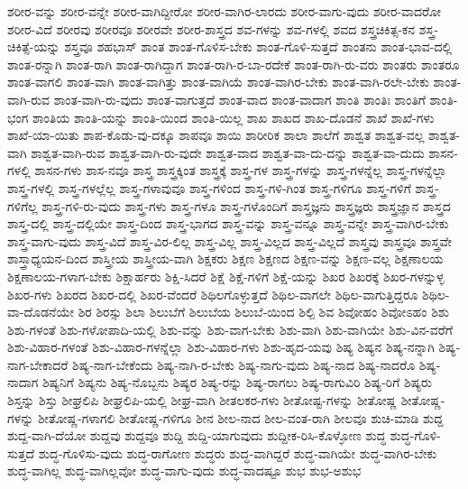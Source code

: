 {ಶರೀರ-ವನ್ನು
ಶರೀರ-ವನ್ನೇ
ಶರೀರ-ವಾಗಿದ್ದೀರೋ
ಶರೀರ-ವಾಗಿರ-ಲಾರದು
ಶರೀರ-ವಾಗು-ವುದು
ಶರೀರ-ವಾದರೋ
ಶರೀರ-ವಿದೆ
ಶರೀರವು
ಶರೀರವೂ
ಶರೀರವೇ
ಶರೀರ-ಶಾಸ್ತ್ರದ
ಶವ-ಗಳನ್ನು
ಶವ-ಗಳಲ್ಲಿ
ಶವದ
ಶಸ್ತ್ರಚಿಕಿತ್ಸ-ಕನ
ಶಸ್ತ್ರ-ಚಿಕಿತ್ಸೆ-ಯನ್ನು
ಶಸ್ತ್ರವೂ
ಶಹಭಾಸ್
ಶಾಂತ
ಶಾಂತ-ಗೊಳಿಸ-ಬೇಕು
ಶಾಂತ-ಗೊಳಿ-ಸುತ್ತದೆ
ಶಾಂತನು
ಶಾಂತ-ಭಾವ-ದಲ್ಲಿ
ಶಾಂತ-ರನ್ನಾಗಿ
ಶಾಂತ-ರಾಗಿ
ಶಾಂತ-ರಾಗಿದ್ದಾಗ
ಶಾಂತ-ರಾಗಿ-ರ-ಬಾ-ರದೇಕೆ
ಶಾಂತ-ರಾಗಿ-ರು-ವರು
ಶಾಂತರು
ಶಾಂತರೂ
ಶಾಂತ-ವಾಗಲಿ
ಶಾಂತ-ವಾಗಿ
ಶಾಂತ-ವಾಗಿತ್ತು
ಶಾಂತ-ವಾಗಿಯೆ
ಶಾಂತ-ವಾಗಿರ-ಬೇಕು
ಶಾಂತ-ವಾಗಿ-ರಲೇ-ಬೇಕು
ಶಾಂತ-ವಾಗಿ-ರುವ
ಶಾಂತ-ವಾಗಿ-ರು-ವುದು
ಶಾಂತ-ವಾಗುತ್ತದೆ
ಶಾಂತ-ವಾದ
ಶಾಂತ-ವಾದಾಗ
ಶಾಂತಿ
ಶಾಂತಿಃ
ಶಾಂತಿಗೆ
ಶಾಂತಿ-ಭಂಗ
ಶಾಂತಿಯ
ಶಾಂತಿ-ಯನ್ನು
ಶಾಂತಿ-ಯಿಂದ
ಶಾಂತಿ-ಯಿಲ್ಲ
ಶಾಖ
ಶಾಖದ
ಶಾಖ-ದೊಡನೆ
ಶಾಖೆ
ಶಾಖೆ-ಗಳು
ಶಾಖೆ-ಯಾ-ಯಿತು
ಶಾಪ-ಕೊಡು-ವು-ದಕ್ಕೂ
ಶಾಪವೂ
ಶಾಯಿ
ಶಾರೀರಿಕ
ಶಾಲಾ
ಶಾಲೆಗೆ
ಶಾಶ್ವತ
ಶಾಶ್ವತ-ವಲ್ಲ
ಶಾಶ್ವತ-ವಾಗಿ
ಶಾಶ್ವತ-ವಾಗಿ-ರುವ
ಶಾಶ್ವತ-ವಾಗಿ-ರು-ವುದೇ
ಶಾಶ್ವತ-ವಾದ
ಶಾಶ್ವತ-ವಾ-ದು-ದನ್ನು
ಶಾಶ್ವತ-ವಾ-ದುದು
ಶಾಸನ-ಗಳಲ್ಲಿ
ಶಾಸನ-ಗಳು
ಶಾಸ-ನವೂ
ಶಾಸ್ತ್ರ
ಶಾಸ್ತ್ರಕ್ಕಿಂತ
ಶಾಸ್ತ್ರಕ್ಕೆ
ಶಾಸ್ತ್ರ-ಗಳ
ಶಾಸ್ತ್ರ-ಗಳನ್ನು
ಶಾಸ್ತ್ರ-ಗಳನ್ನೆಲ್ಲ
ಶಾಸ್ತ್ರ-ಗಳನ್ನೆಲ್ಲಾ
ಶಾಸ್ತ್ರ-ಗಳಲ್ಲಿ
ಶಾಸ್ತ್ರ-ಗಳಲ್ಲೆಲ್ಲ
ಶಾಸ್ತ್ರ-ಗಳಾವುವೂ
ಶಾಸ್ತ್ರ-ಗಳಿಂದ
ಶಾಸ್ತ್ರ-ಗಳಿ-ಗಿಂತ
ಶಾಸ್ತ್ರ-ಗಳಿಗೂ
ಶಾಸ್ತ್ರ-ಗಳಿಗೆ
ಶಾಸ್ತ್ರ-ಗಳಿಗೆಲ್ಲ
ಶಾಸ್ತ್ರ-ಗಳಿ-ರು-ವುದು
ಶಾಸ್ತ್ರ-ಗಳು
ಶಾಸ್ತ್ರ-ಗಳೂ
ಶಾಸ್ತ್ರ-ಗಳೊಂದಿಗೆ
ಶಾಸ್ತ್ರಜ್ಞನು
ಶಾಸ್ತ್ರಜ್ಞರು
ಶಾಸ್ತ್ರಜ್ಞಾನ
ಶಾಸ್ತ್ರದ
ಶಾಸ್ತ್ರ-ದಲ್ಲಿ
ಶಾಸ್ತ್ರ-ದಲ್ಲಿಯೇ
ಶಾಸ್ತ್ರ-ದಿಂದ
ಶಾಸ್ತ್ರ-ಭಾಗದ
ಶಾಸ್ತ್ರ-ವನ್ನು
ಶಾಸ್ತ್ರ-ವನ್ನೂ
ಶಾಸ್ತ್ರ-ವನ್ನೇ
ಶಾಸ್ತ್ರ-ವಾಗಿರ-ಬೇಕು
ಶಾಸ್ತ್ರ-ವಾಗು-ವುದು
ಶಾಸ್ತ್ರ-ವಿದೆ
ಶಾಸ್ತ್ರ-ವಿರ-ಲಿಲ್ಲ
ಶಾಸ್ತ್ರ-ವಿಲ್ಲ
ಶಾಸ್ತ್ರ-ವಿಲ್ಲದ
ಶಾಸ್ತ್ರ-ವಿಲ್ಲದೆ
ಶಾಸ್ತ್ರವು
ಶಾಸ್ತ್ರವೂ
ಶಾಸ್ತ್ರವೇ
ಶಾಸ್ತ್ರಾಧ್ಯಯನ-ದಿಂದ
ಶಾಸ್ತ್ರೀಯ
ಶಾಸ್ತ್ರೀಯ-ವಾಗಿ
ಶಿಕ್ಷಕರು
ಶಿಕ್ಷಣ
ಶಿಕ್ಷಣದ
ಶಿಕ್ಷಣ-ವನ್ನು
ಶಿಕ್ಷಣ-ವಲ್ಲ
ಶಿಕ್ಷಣಾಲಯ
ಶಿಕ್ಷಣಾಲಯ-ಗಳಾಗ-ಬೇಕು
ಶಿಕ್ಷಾರ್ಹರು
ಶಿಕ್ಷಿ-ಸಿದರೆ
ಶಿಕ್ಷೆ
ಶಿಕ್ಷೆ-ಗಳಿಗೆ
ಶಿಕ್ಷೆ-ಯನ್ನು
ಶಿಖರ
ಶಿಖರಕ್ಕೆ
ಶಿಖರ-ಗಳನ್ನುಳ್ಳ
ಶಿಖರ-ಗಳು
ಶಿಖರದ
ಶಿಖರ-ದಲ್ಲಿ
ಶಿಖರ-ವೆಂದರೆ
ಶಿಥಿಲಗೊಳ್ಳುತ್ತದೆ
ಶಿಥಿಲ-ವಾಗಲೇ
ಶಿಥಿಲ-ವಾಗುತ್ತಿದ್ದರೂ
ಶಿಥಿಲ-ವಾ-ದೊಡನೆಯೇ
ಶಿರ
ಶಿರಸ್ಸು
ಶಿಲಾ
ಶಿಲುಬೆಗೆ
ಶಿಲುಬೆಯ
ಶಿಲುಬೆ-ಯಿಂದ
ಶಿಲ್ಪಿ
ಶಿವ
ಶಿವೋಹಂ
ಶಿವೋಽಹಂ
ಶಿಶು
ಶಿಶು-ಗಳಂತೆ
ಶಿಶು-ಗಳೋಪಾದಿ-ಯಲ್ಲಿ
ಶಿಶು-ವನ್ನು
ಶಿಶು-ವಾಗ-ಬೇಕು
ಶಿಶು-ವಾಗಿ
ಶಿಶು-ವಾಗಿಯೇ
ಶಿಶು-ವಿನ-ವರೆಗೆ
ಶಿಶು-ವಿಹಾರ-ಗಳಂತೆ
ಶಿಶು-ವಿಹಾರ-ಗಳನ್ನೆಲ್ಲಾ
ಶಿಶು-ವಿಹಾರ-ಗಳು
ಶಿಶು-ಹೃದ-ಯವು
ಶಿಷ್ಯ
ಶಿಷ್ಯನ
ಶಿಷ್ಯ-ನನ್ನಾಗಿ
ಶಿಷ್ಯ-ನಾಗ-ಬೇಕಾದರೆ
ಶಿಷ್ಯ-ನಾಗ-ಬೇಕೆಂದು
ಶಿಷ್ಯ-ನಾಗಿ-ರ-ಬೇಕು
ಶಿಷ್ಯ-ನಾಗು-ವುದು
ಶಿಷ್ಯ-ನಾದ
ಶಿಷ್ಯ-ನಾದರೊ
ಶಿಷ್ಯ-ನಾದಾಗ
ಶಿಷ್ಯನಿಗೆ
ಶಿಷ್ಯನು
ಶಿಷ್ಯ-ನೊಬ್ಬನು
ಶಿಷ್ಯರ
ಶಿಷ್ಯ-ರನ್ನು
ಶಿಷ್ಯ-ರಾಗಲು
ಶಿಷ್ಯ-ರಾಗುವಿರಿ
ಶಿಷ್ಯ-ರಿಗೆ
ಶಿಷ್ಯರು
ಶಿಸ್ತನ್ನು
ಶಿಸ್ತು
ಶೀಘ್ರಲಿಪಿ
ಶೀಘ್ರಲಿಪಿ-ಯಲ್ಲಿ
ಶೀಘ್ರ-ವಾಗಿ
ಶೀತಲಕರ-ಗಳು
ಶೀತೋಷ್ಟ-ಗಳನ್ನು
ಶೀತೋಷ್ಣ
ಶೀತೋಷ್ಣ-ಗಳನ್ನು
ಶೀತೋಷ್ಣ-ಗಳಾಗಲಿ
ಶೀತೋಷ್ಣ-ಗಳಿಗೂ
ಶೀನ
ಶೀಲ-ನಾದ
ಶೀಲ-ವಂತ-ರಾಗಿ
ಶೀಲವೂ
ಶುಚಿ-ಮಾಡಿ
ಶುದ್ದ
ಶುದ್ದ-ವಾಗಿ-ದೆಯೋ
ಶುದ್ದವು
ಶುದ್ದವೂ
ಶುದ್ದಿ
ಶುದ್ದಿ-ಯಾಗುವುದು
ಶುದ್ದೀಕ-ರಿಸಿ-ಕೊಳ್ಳೋಣ
ಶುದ್ಧ
ಶುದ್ಧ-ಗೊಳಿ-ಸುತ್ತದೆ
ಶುದ್ಧ-ಗೊಳಿಸು-ವುದು
ಶುದ್ಧ-ರಾಗೋಣ
ಶುದ್ಧರು
ಶುದ್ಧ-ವಾಗಿದ್ದರೆ
ಶುದ್ಧ-ವಾಗಿಯೇ
ಶುದ್ಧ-ವಾಗಿರ-ಬೇಕು
ಶುದ್ಧ-ವಾಗಿಲ್ಲ
ಶುದ್ಧ-ವಾಗಿಲ್ಲವೋ
ಶುದ್ಧ-ವಾಗು-ವುದು
ಶುದ್ಧ-ವಾದಷ್ಟೂ
ಶುಭ
ಶುಭ-ಅಶುಭ
}
